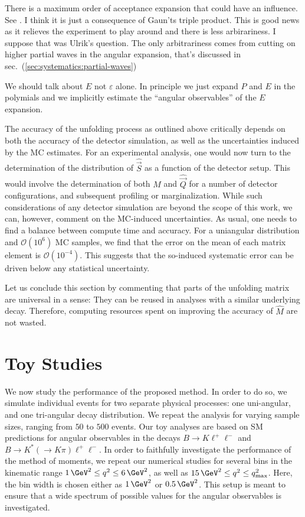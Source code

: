 \documentclass[aps,nofootinbib,preprintnumbers,prd,twocolumn]{revtex4-1}
\newcommand{\est}[1]{\widehat{#1}}
\newcommand{\order}[1]{\mathcal{O}\left({#1}\right)}
\newcommand{\refsec}[1]{sec.~(\ref{sec:#1})}
\let\eps\varepsilon
\newcommand{\vecest}[1]{\widehat{\vec{#1}}}
\newcommand{\fred}[1]{{\color{brown!85!black}#1}}
\begin{document}
\fred{There is a maximum order of acceptance expansion that could have
  an influence. See \cite[below (118)]{Chung:1997qd}. I think it is
  just a consequence of Gaun'ts triple product. This is good news as
  it relieves the experiment to play around and there is less
  arbirariness. I suppose that was Ulrik's question. The only
  arbitrariness comes from cutting on higher partial waves in the
  angular expansion, that's discussed in
  \refsec{systematics:partial-waves}

  We should talk about $E$ not $\eps$ alone. In principle we just
  expand $P$ and $E$ in the polymials and we implicitly estimate the
  ``angular observables'' of the $E$ expansion.}

The accuracy of the unfolding process as outlined above critically depends on
both the accuracy of the detector simulation, as well as the uncertainties
induced by the MC estimates.  For an experimental analysis, one would now turn
to the determination of the distribution of $\vecest{S}$ as a function of the
detector setup. This would involve the determination of both $M$ and
$\vecest{Q}$ for a number of detector configurations, and subsequent profiling
or marginalization.  While such considerations of any detector simulation are
beyond the scope of this work, we can, however, comment on the MC-induced
uncertainties. As usual, one needs to find a balance between compute time and
accuracy. For a uniangular distribution and $\order{10^6}$ MC samples, we find
that the error on the mean of each matrix element is $\order{10^{-4}}$.
This suggests that the so-induced systematic error can be driven below any
statistical uncertainty.

Let us conclude this section by commenting that parts of the unfolding matrix
are universal in a sense: They can be reused in analyses with a
similar underlying decay.  Therefore, computing resources spent on improving
the accuracy of $\est{M}$ are not wasted.


\section{Toy Studies}
\label{sec:numerics}

We now study the performance of the proposed method. In order to do so, we simulate
individual events for two separate physical processes: one uni-angular, and one tri-angular decay
distribution. We repeat the analysis for varying sample sizes, ranging from
$50$ to $500$ events. Our toy analyses are based on SM predictions for angular observables
in the decays $B\to K\ell^+\ell^-$ and $B\to K^*(\to K\pi)\ell^+\ell^-$.
In order to faithfully investigate the performance of the method of moments, we repeat our
numerical studies for several bins in the kinematic range $1\,\GeV^2 \leq q^2 \leq 6\,\GeV^2$,
as well as $15\,\GeV^2 \leq q^2 \leq q^2_\text{max}$. Here, the bin width is chosen either
as $1\,\GeV^2$ or $0.5\,\GeV^2$. This setup is meant to ensure that a wide spectrum of possible
values for the angular observables is investigated.\\
\end{document}
